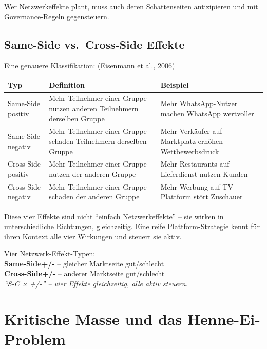 \documentclass[11pt,a4paper,oneside]{article}
\newcommand{\caveatfontfallback}{\itshape}
\newcommand\caveatfont{\caveatfontfallback}%
\newcommand{\akzent}[1]{{\caveatfont\color{lpAmber}#1}}
\newcommand{\quelle}[1]{{\footnotesize\color{lpGray}(#1)}}
\begin{document}
Wer Netzwerkeffekte plant, muss auch deren Schattenseiten antizipieren und mit Governance-Regeln gegensteuern.

\subsection{Same-Side vs.\ Cross-Side Effekte}

Eine genauere Klassifikation: \quelle{Eisenmann et al., 2006}

\begin{tabularx}{\linewidth}{@{}lXX@{}}
\toprule
Typ & Definition & Beispiel \\
\midrule
Same-Side positiv     & Mehr Teilnehmer einer Gruppe nutzen anderen Teilnehmern derselben Gruppe & Mehr WhatsApp-Nutzer machen WhatsApp wertvoller \\
Same-Side negativ     & Mehr Teilnehmer einer Gruppe schaden Teilnehmern derselben Gruppe       & Mehr Verkäufer auf Marktplatz erhöhen Wettbewerbsdruck \\
Cross-Side positiv    & Mehr Teilnehmer einer Gruppe nutzen der anderen Gruppe                 & Mehr Restaurants auf Lieferdienst nutzen Kunden \\
Cross-Side negativ    & Mehr Teilnehmer einer Gruppe schaden der anderen Gruppe                & Mehr Werbung auf TV-Plattform stört Zuschauer \\
\bottomrule
\end{tabularx}

\medskip

\noindent Diese vier Effekte sind nicht ``einfach Netzwerkeffekte'' -- sie wirken in unterschiedliche Richtungen, gleichzeitig. Eine reife Plattform-Strategie kennt für ihren Kontext alle vier Wirkungen und steuert sie aktiv.

\begin{eselsbox}[Eselsbrücke: \akzent{S-C × +/-}]
Vier Netzwerk-Effekt-Typen:\\[2pt]
\textbf{Same-Side+/-} -- gleicher Marktseite gut/schlecht\\
\textbf{Cross-Side+/-} -- anderer Marktseite gut/schlecht\\[2pt]
\emph{``S-C × +/-'' -- vier Effekte gleichzeitig, alle aktiv steuern.}
\end{eselsbox}

\section{Kritische Masse und das Henne-Ei-Problem}
\end{document}
